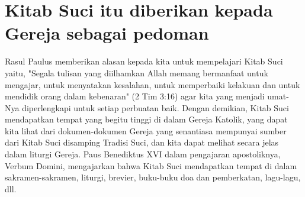 \section*{Kitab Suci itu diberikan kepada Gereja sebagai pedoman}
Rasul Paulus memberikan alasan kepada kita untuk mempelajari Kitab Suci yaitu, "Segala tulisan yang diilhamkan Allah memang bermanfaat untuk mengajar, untuk menyatakan kesalahan, untuk memperbaiki kelakuan dan untuk mendidik orang dalam kebenaran" (2 Tim 3:16) agar kita yang menjadi umat-Nya diperlengkapi untuk setiap perbuatan baik. Dengan demikian, Kitab Suci mendapatkan tempat yang begitu tinggi di dalam Gereja Katolik, yang dapat kita lihat dari dokumen-dokumen Gereja yang senantiasa mempunyai sumber dari Kitab Suci disamping Tradisi Suci, dan kita dapat melihat secara jelas dalam liturgi Gereja. Paus Benediktus XVI dalam pengajaran apostoliknya, Verbum Domini, mengajarkan bahwa Kitab Suci mendapatkan tempat di dalam sakramen-sakramen, liturgi, brevier, buku-buku doa dan pemberkatan, lagu-lagu, dll.


